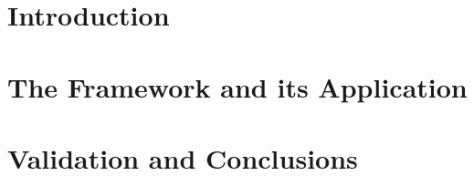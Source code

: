 \documentclass[ twoside,openright,titlepage,numbers=noenddot,headinclude,%
                footinclude=true,cleardoublepage=empty,abstractoff, %
                BCOR=5mm,paper=a4,fontsize=11pt,%
                ngerman,american,%
                ]{scrreprt}
\begin{document}
\frenchspacing
\raggedbottom
{} %
\pagestyle{plain}

%
%
\pagestyle{scrheadings}
\cleardoublepage
\cleardoublepage{}
\cleardoublepage
\part{Introduction}


\part{The Framework and its Application}



\part{Validation and Conclusions}


\cleardoublepage
\end{document}
